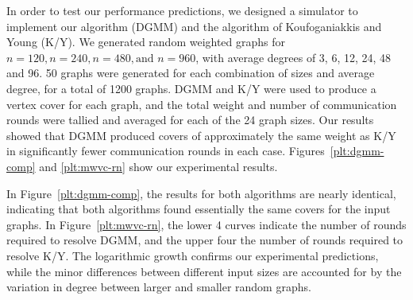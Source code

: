 In order to test our performance predictions, we designed a simulator to implement our algorithm (DGMM) and the algorithm of Koufoganiakkis and Young (K/Y). We generated random weighted graphs for $n=120, n=240, n=480, \text{and } n=960$, with average degrees of 3, 6, 12, 24, 48 and 96. 50 graphs were generated for each combination of sizes and average degree, for a total of 1200 graphs. DGMM and K/Y were used to produce a vertex cover for each graph, and the total weight and number of communication rounds were tallied and averaged for each of the 24 graph sizes. Our results showed that DGMM produced covers of approximately the same weight as K/Y in significantly fewer communication rounds in each case. Figures~\ref{plt:dgmm-comp} and \ref{plt:mwvc-rn} show our experimental results.




In Figure~\ref{plt:dgmm-comp}, the results for both algorithms are nearly identical, indicating that both algorithms found essentially the same covers for the input graphs. In Figure~\ref{plt:mwvc-rn}, the lower 4 curves indicate the number of rounds required to resolve DGMM, and the upper four the number of rounds required to resolve K/Y. The logarithmic growth confirms our experimental predictions, while the minor differences between different input sizes are accounted for by the variation in degree between larger and smaller random graphs.
